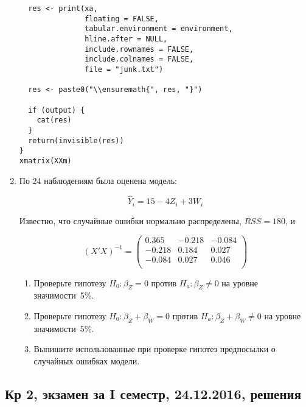 \documentclass[12pt, a4paper]{article}
\theoremstyle{definition}
\begin{document}
\begin{enumerate}
\begin{verbatim}
  res <- print(xa,
               floating = FALSE,
               tabular.environment = environment,
               hline.after = NULL,
               include.rownames = FALSE,
               include.colnames = FALSE,
               file = "junk.txt")

  res <- paste0("\\ensuremath{", res, "}")

  if (output) {
    cat(res)
  }
  return(invisible(res))
}
xmatrix(XXm)
\end{verbatim}

\item По 24 наблюдениям была оценена модель:

\[
\widehat{Y}_i=15-4Z_i+3W_i
\]

Известно, что случайные ошибки нормально распределены, $RSS=180$, и

\[
(X'X)^{-1} =
\begin{pmatrix}
  0.365 & -0.218 & -0.084 \\
  -0.218 & 0.184 & 0.027 \\
  -0.084 & 0.027 & 0.046 \\
  \end{pmatrix}
\]


\begin{enumerate}
\item Проверьте гипотезу $H_0: \beta_Z = 0$ против $H_a: \beta_Z \neq 0$ на уровне значимости~5\%.
\item Проверьте гипотезу $H_0: \beta_Z + \beta_W = 0$  против $H_a: \beta_Z + \beta_W \neq 0$ на уровне значимости~5\%.
\item Выпишите использованные при проверке гипотез предпосылки о случайных ошибках модели.
\end{enumerate}


\end{enumerate}

\subsection{Кр 2, экзамен за I семестр, 24.12.2016, решения}
\end{document}

